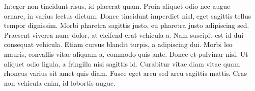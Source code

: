 Integer non tincidunt risus, id placerat quam. Proin aliquet odio nec augue ornare, in varius lectus dictum. Donec tincidunt imperdiet nisl, eget sagittis tellus tempor dignissim. Morbi pharetra sagittis justo, eu pharetra justo adipiscing sed. Praesent viverra nunc dolor, at eleifend erat vehicula a. Nam suscipit est id dui consequat vehicula. Etiam cursus blandit turpis, a adipiscing dui. Morbi leo mauris, convallis vitae aliquam a, commodo quis ante. Donec et pulvinar nisi. Ut aliquet odio ligula, a fringilla nisi sagittis id. Curabitur vitae diam vitae quam rhoncus varius sit amet quis diam. Fusce eget arcu sed arcu sagittis mattis. Cras non vehicula enim, id lobortis augue.